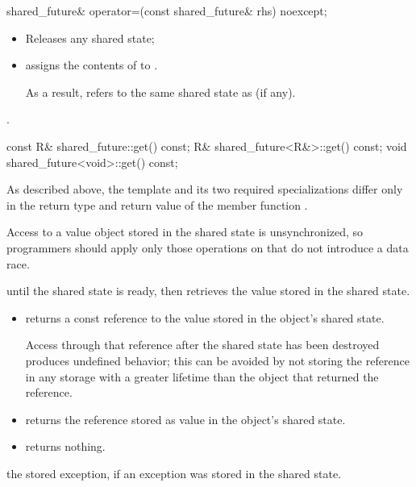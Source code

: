 %
\begin{itemdecl}
shared_future& operator=(const shared_future& rhs) noexcept;
\end{itemdecl}

\begin{itemdescr}
\pnum
\effects
\begin{itemize}
\item
Releases any shared state;
\item
assigns the contents of  to . \begin{note} As a result,
 refers to the same shared state as 
(if any). \end{note}
\end{itemize}

\pnum
\postconditions {}.
\end{itemdescr}

%
\begin{itemdecl}
const R& shared_future::get() const;
R& shared_future<R&>::get() const;
void shared_future<void>::get() const;
\end{itemdecl}

\begin{itemdescr}
\pnum
\begin{note}
As described above, the template and its two required specializations differ only in
the return type and return value of the member function .
\end{note}

\pnum
\begin{note}
Access to a value object stored in the shared state is
unsynchronized, so programmers should apply only those operations on  that do not
introduce a data race.
\end{note}

\pnum
\effects {} until the shared state is ready, then retrieves the
value stored in the shared state.

\pnum
\returns
\begin{itemize}
\item
{} returns a const reference to the value stored in the object's
shared state.
\begin{note} Access through that reference after the shared state has been
destroyed produces undefined behavior; this can be avoided by not storing the reference in any
storage with a greater lifetime than the  object that returned the
reference. \end{note}

\item
{} returns the reference stored as value in the object's
shared state.

\item
{} returns nothing.
\end{itemize}

\pnum
\throws the stored exception, if an exception was stored in the shared state.
\end{itemdescr}

